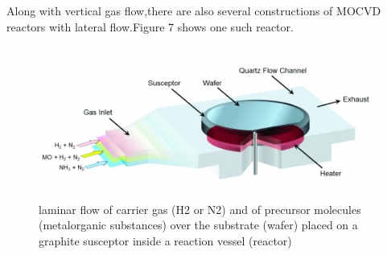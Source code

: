 \begin{flushleft}
\vspace{3mm}
\newline
Along with vertical gas flow,there are also several constructions of MOCVD reactors with lateral flow.Figure 7 shows one such reactor.
\vspace{3mm}
\newline
\begin{figure}[h!] 
	\centering
	\includegraphics[width=11cm, height=5cm]{images/reactor2.png} 
	\caption{laminar flow of carrier gas (H2 or N2) and of precursor molecules (metalorganic substances) over the substrate (wafer) placed on a graphite susceptor inside a reaction vessel (reactor) }
	\label{fig:img7} 
\end{figure}
\vspace{3mm}
\newline

\end{flushleft}
